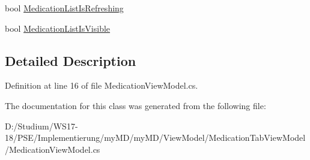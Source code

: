 \begin{CompactItemize}
\item 
\hypertarget{classmy_m_d_1_1_view_model_1_1_medication_tab_view_model_1_1_medication_view_model_59dafffded95691adb3af6eff07d9318}{
bool \hyperlink{classmy_m_d_1_1_view_model_1_1_medication_tab_view_model_1_1_medication_view_model_59dafffded95691adb3af6eff07d9318}{Medication\-List\-Is\-Refreshing}}
\label{dc/d91/classmy_m_d_1_1_view_model_1_1_medication_tab_view_model_1_1_medication_view_model_59dafffded95691adb3af6eff07d9318}

\item 
\hypertarget{classmy_m_d_1_1_view_model_1_1_medication_tab_view_model_1_1_medication_view_model_de8cc995eb2a430634b26765267e0311}{
bool \hyperlink{classmy_m_d_1_1_view_model_1_1_medication_tab_view_model_1_1_medication_view_model_de8cc995eb2a430634b26765267e0311}{Medication\-List\-Is\-Visible}}
\label{dc/d91/classmy_m_d_1_1_view_model_1_1_medication_tab_view_model_1_1_medication_view_model_de8cc995eb2a430634b26765267e0311}

\end{CompactItemize}


\subsection{Detailed Description}




Definition at line 16 of file Medication\-View\-Model.cs.

The documentation for this class was generated from the following file:\begin{CompactItemize}
\item 
D:/Studium/WS17-18/PSE/Implementierung/my\-MD/my\-MD/View\-Model/Medication\-Tab\-View\-Model/Medication\-View\-Model.cs\end{CompactItemize}
